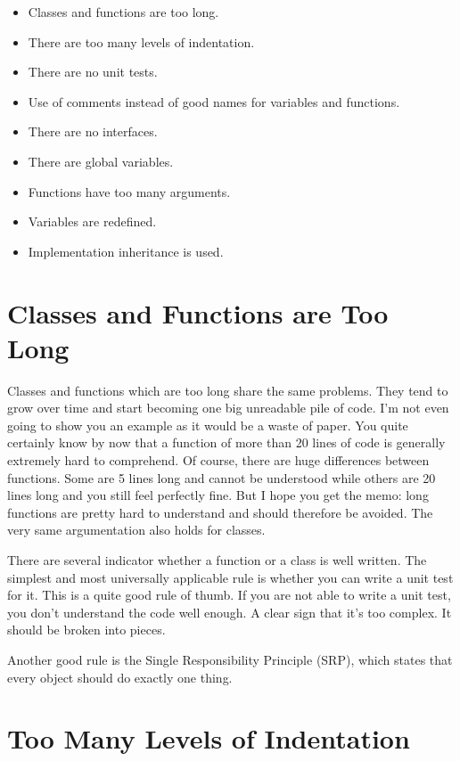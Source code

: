 \begin{itemize}
    \item Classes and functions are too long.
    \item There are too many levels of indentation.
    \item There are no unit tests.
    \item Use of comments instead of good names for variables and functions.
    \item There are no interfaces.
    \item There are global variables.
    \item Functions have too many arguments.
    \item Variables are redefined.
    \item Implementation inheritance is used.
\end{itemize}

\section{Classes and Functions are Too Long}

Classes and functions which are too long share the same problems. They tend to grow over time and start becoming one big unreadable pile of code. I'm not even going to show you an example as it would be a waste of paper. You quite certainly know by now that a function of more than 20 lines of code is generally extremely hard to comprehend. Of course, there are huge differences between functions. Some are 5 lines long and cannot be understood while others are 20 lines long and you still feel perfectly fine. But I hope you get the memo: long functions are pretty hard to understand and should therefore be avoided. The very same argumentation also holds for classes.

There are several indicator whether a function or a class is well written. The simplest and most universally applicable rule is whether you can write a unit test for it. This is a quite good rule of thumb. If you are not able to write a unit test, you don't understand the code well enough. A clear sign that it's too complex. It should be broken into pieces.

Another good rule is the Single Responsibility Principle (SRP), which states that every object should do exactly one thing. 

\section{Too Many Levels of Indentation}

